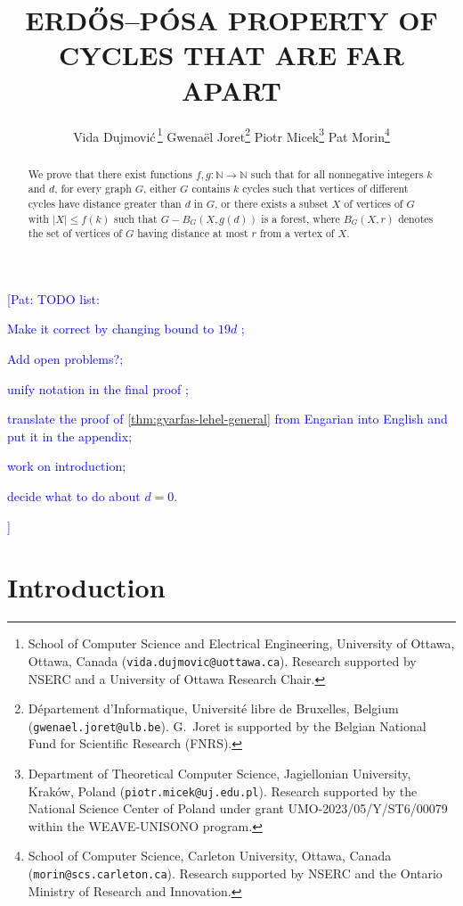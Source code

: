 \documentclass{patmorin}
\title{\MakeUppercase{{E}rdős–{P}ósa property of cycles that are far apart}}
\author{
 Vida Dujmovi{\'c}\,\footnote{School of Computer Science and Electrical Engineering, University of Ottawa, Ottawa, Canada (\texttt{vida.dujmovic@uottawa.ca}). Research supported by NSERC and a University of Ottawa Research Chair.}
 \qquad
 Gwena\"el Joret\footnote{D\'epartement d'Informatique, Universit\'e libre de Bruxelles, Belgium ({\tt gwenael.joret@ulb.be}). G.\ Joret is supported by the Belgian National Fund for Scientific Research (FNRS).}
 \qquad
 Piotr Micek\footnote{Department of Theoretical Computer Science, Jagiellonian University, Kraków, Poland (\texttt{piotr.micek@uj.edu.pl}). Research supported by the National Science Center of Poland under grant
UMO-2023/05/Y/ST6/00079 within the WEAVE-UNISONO program.}
 \qquad
 Pat Morin\footnote{School of Computer Science, Carleton University, Ottawa, Canada (\texttt{morin@scs.carleton.ca}). Research supported by NSERC and the Ontario Ministry of Research and Innovation.}}
\date{}
\newcommand{\pat}[1]{\textcolor{Blue}{[Pat: #1]}}
\begin{document}
\maketitle


\noindent
\pat{TODO list: 
\begin{enumerate*}
    \item Make it correct by changing bound to $19d$ \checkmark; 
    \item Add open problems?; 
    \item unify notation in the final proof \checkmark; 
    \item translate the proof of \cref{thm:gyarfas-lehel-general} from Engarian into English and put it in the appendix; 
    \item work on introduction; 
    \item decide what to do about $d=0$.
\end{enumerate*}}

\begin{abstract}
  We prove that there exist functions  $f,g:\mathbb{N}\to\mathbb{N}$ such that for all nonnegative integers $k$ and $d$,  for every graph $G$,  either $G$ contains $k$ cycles such that vertices of different cycles have distance greater than $d$ in $G$, or there exists a subset $X$ of vertices of $G$ with $|X|\leq f(k)$ such that  $G-B_G(X,g(d))$ is a forest, where $B_G(X,r)$ denotes the set of vertices of $G$ having distance at most $r$ from a vertex of $X$.
\end{abstract}



\section{Introduction}
\end{document}
